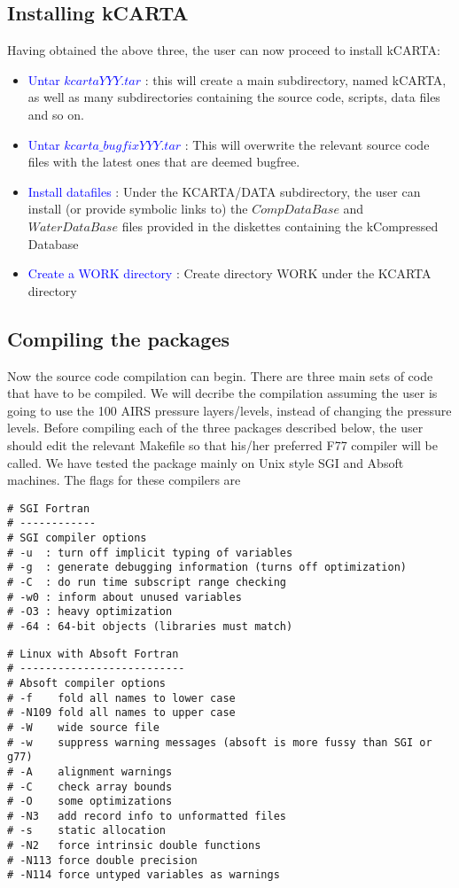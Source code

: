 \documentclass[12pt]{article}
\newcommand{\kc}{\textsf{kCARTA}\xspace}
\begin{document}
\subsection{Installing \kc}
Having obtained the above three, the user can now proceed to install \kc :
\begin{itemize}
\item \textcolor{blue} {Untar $kcartaYYY.tar$} :  this will create a main 
subdirectory, named \kc,
as well as many subdirectories containing the source code, scripts, data files
and so on.
\item \textcolor{blue} {Untar $kcarta\_bugfixYYY.tar$} :  This will overwrite 
the relevant source code files with the latest ones that are deemed bugfree. 
\item \textcolor{blue} {Install datafiles} : Under the KCARTA/DATA 
subdirectory, the user can install (or provide symbolic links to) the 
$CompDataBase$ and $WaterDataBase$ files provided in the diskettes 
containing the kCompressed Database
\item \textcolor{blue} {Create a WORK directory} : Create directory WORK
under the KCARTA directory
\end{itemize}

\subsection{Compiling the packages}
Now the source code compilation can begin. There are three main sets of code
that have to be compiled. We will decribe the compilation assuming the user 
is going to use the 100 AIRS pressure layers/levels, instead of changing the 
pressure levels. Before compiling each of the three packages described below, 
the user should edit the relevant Makefile so that his/her preferred F77 
compiler will be called. We have tested the package mainly on Unix style 
SGI and Absoft machines. The flags for these compilers are
\begin{verbatim}
# SGI Fortran
# ------------
# SGI compiler options
# -u  : turn off implicit typing of variables
# -g  : generate debugging information (turns off optimization)
# -C  : do run time subscript range checking
# -w0 : inform about unused variables
# -O3 : heavy optimization
# -64 : 64-bit objects (libraries must match)
\end{verbatim}
\begin{verbatim}
# Linux with Absoft Fortran
# --------------------------
# Absoft compiler options
# -f    fold all names to lower case
# -N109 fold all names to upper case
# -W    wide source file
# -w    suppress warning messages (absoft is more fussy than SGI or g77)
# -A    alignment warnings
# -C    check array bounds
# -O    some optimizations
# -N3   add record info to unformatted files
# -s    static allocation
# -N2   force intrinsic double functions
# -N113 force double precision
# -N114 force untyped variables as warnings
\end{verbatim}
\end{document}
